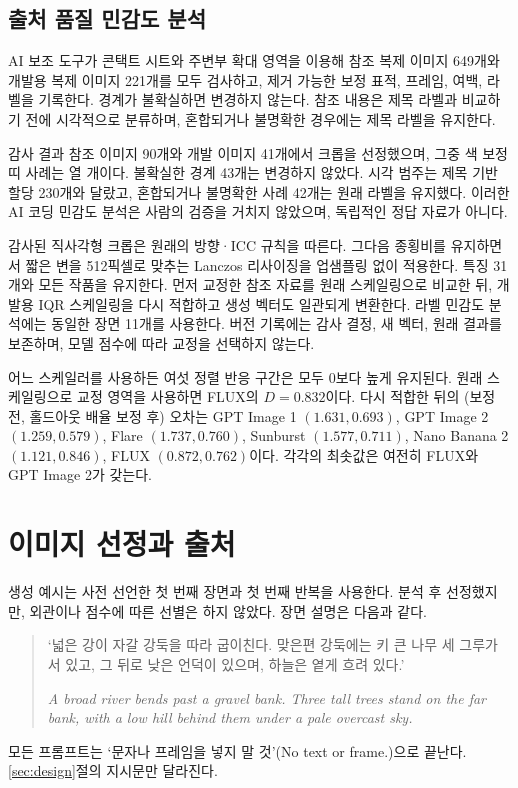 \documentclass[11pt,a4paper]{article}
\begin{document}
\subsection{출처 품질 민감도 분석}\label{app:reference-quality}
AI 보조 도구가 콘택트 시트와 주변부 확대 영역을 이용해 참조 복제 이미지 649개와 개발용 복제 이미지 221개를 모두 검사하고, 제거 가능한 보정 표적, 프레임, 여백, 라벨을 기록한다. 경계가 불확실하면 변경하지 않는다. 참조 내용은 제목 라벨과 비교하기 전에 시각적으로 분류하며, 혼합되거나 불명확한 경우에는 제목 라벨을 유지한다.

감사 결과 참조 이미지 90개와 개발 이미지 41개에서 크롭을 선정했으며, 그중 색 보정 띠 사례는 열 개이다. 불확실한 경계 43개는 변경하지 않았다. 시각 범주는 제목 기반 할당 230개와 달랐고, 혼합되거나 불명확한 사례 42개는 원래 라벨을 유지했다. 이러한 AI 코딩 민감도 분석은 사람의 검증을 거치지 않았으며, 독립적인 정답 자료가 아니다.

감사된 직사각형 크롭은 원래의 방향·ICC 규칙을 따른다. 그다음 종횡비를 유지하면서 짧은 변을 512픽셀로 맞추는 Lanczos 리사이징을 업샘플링 없이 적용한다. 특징 31개와 모든 작품을 유지한다. 먼저 교정한 참조 자료를 원래 스케일링으로 비교한 뒤, 개발용 IQR 스케일링을 다시 적합하고 생성 벡터도 일관되게 변환한다. 라벨 민감도 분석에는 동일한 장면 11개를 사용한다. 버전 기록에는 감사 결정, 새 벡터, 원래 결과를 보존하며, 모델 점수에 따라 교정을 선택하지 않는다.

어느 스케일러를 사용하든 여섯 정렬 반응 구간은 모두 0보다 높게 유지된다. 원래 스케일링으로 교정 영역을 사용하면 FLUX의 $D=0.832$이다. 다시 적합한 뒤의 (보정 전, 홀드아웃 배율 보정 후) 오차는 GPT Image 1 $(1.631,0.693)$, GPT Image 2 $(1.259,0.579)$, Flare $(1.737,0.760)$, Sunburst $(1.577,0.711)$, Nano Banana 2 $(1.121,0.846)$, FLUX $(0.872,0.762)$이다. 각각의 최솟값은 여전히 FLUX와 GPT Image 2가 갖는다.

\section{이미지 선정과 출처}\label{app:images}
생성 예시는 사전 선언한 첫 번째 장면과 첫 번째 반복을 사용한다. 분석 후 선정했지만, 외관이나 점수에 따른 선별은 하지 않았다. 장면 설명은 다음과 같다.
\begin{quote}
‘넓은 강이 자갈 강둑을 따라 굽이친다. 맞은편 강둑에는 키 큰 나무 세 그루가 서 있고, 그 뒤로 낮은 언덕이 있으며, 하늘은 옅게 흐려 있다.’

\textit{A broad river bends past a gravel bank. Three tall trees stand on the far bank, with a low hill behind them under a pale overcast sky.}
\end{quote}
모든 프롬프트는 ‘문자나 프레임을 넣지 말 것’(No text or frame.)으로 끝난다. \ref{sec:design}절의 지시문만 달라진다.
\end{document}
